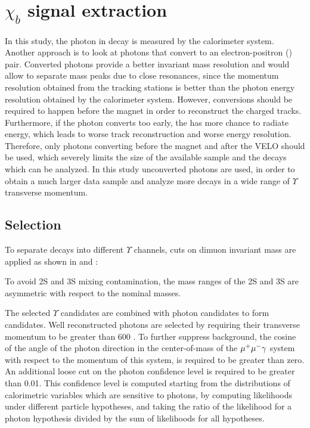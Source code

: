 \section{\texorpdfstring{$\chi_b$}{xb} signal extraction}
\label{sec:chib}

In this study, the photon in \chib decay is measured by the calorimeter system.
Another approach is to look at photons that convert to an electron-positron
(\epem) pair. Converted photons provide a better invariant mass resolution and would 
allow to separate mass peaks due to close resonances, since the 
\epm momentum 
resolution obtained from the tracking stations is better than the photon energy resolution obtained
by the calorimeter system. However, conversions should be required to happen before the magnet in
order to reconstruct the charged tracks. Furthermore, if the photon converts too
early, the \epm has more chance to radiate energy, which leads to worse
track reconstruction and worse energy resolution. Therefore, only photons
converting before the magnet and after the VELO should be used, which severely limits 
the size of the available sample and the decays which can be analyzed. In this study 
unconverted photons are used, in order to obtain a much larger data sample and 
analyze more decays in a wide range of $\Upsilon$ transverse momentum. 

\subsection{Selection}
\label{sec:chib:selection}

To separate decays into different $\Upsilon$ channels, cuts on dimuon invariant mass are 
applied as shown in  and :




To avoid \Y2S and \Y3S mixing contamination, the mass ranges of the \Y2S and \Y3S are
asymmetric with respect to the nominal masses.

The selected $\Upsilon$ candidates  are combined with photon candidates to form
\chib candidates. Well reconstructed photons are selected by requiring their 
transverse momentum to be greater than 600 \mevc. To further suppress background, 
the cosine of the angle of the photon direction in the center-of-mass of the
$\mu^+\mu^-\gamma$ system with respect to the momentum of this system, is required to
be greater than zero. An additional loose cut on the photon confidence level is
required to be greater than 0.01. This confidence level is computed starting from the distributions 
of calorimetric variables which are sensitive to photons, by computing likelihoods under different particle 
hypotheses, and taking   
the ratio of the likelihood for a photon hypothesis divided by the sum of likelihoods for all hypotheses. 


